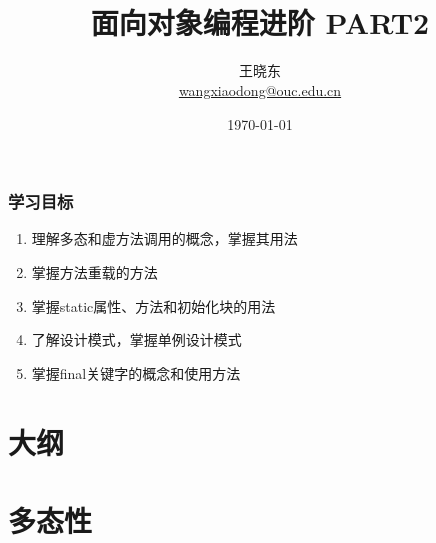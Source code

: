 
\title[JAVA]{\\  
 面向对象编程进阶 PART2}
\author[王晓东]{王晓东\\
  \href{mailto:wangxiaodong@ouc.edu.cn}{\footnotesize wangxiaodong@ouc.edu.cn}}
\date{\today}


 \frame{\titlepage}

\begin{frame}
 \frametitle{学习目标}
 \begin{enumerate}
 \item 理解多态和虚方法调用的概念，掌握其用法
 \item 掌握方法重载的方法
 \item 掌握static属性、方法和初始化块的用法
 \item 了解设计模式，掌握单例设计模式
 \item 掌握final关键字的概念和使用方法
 \end{enumerate}  
\end{frame}

\section*{大纲}

\section{多态性}

